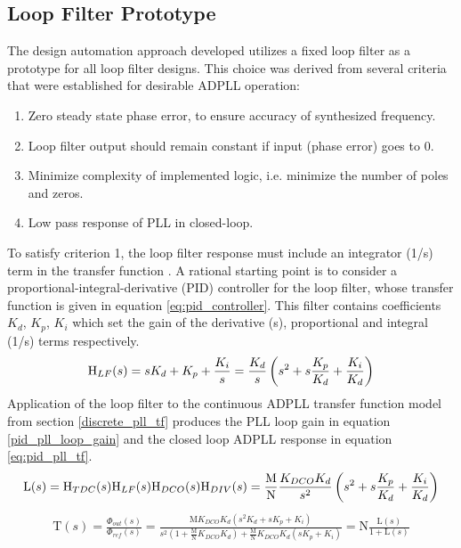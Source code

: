 \subsection{Loop Filter Prototype}
	The design automation approach developed utilizes a fixed loop filter as a prototype for all loop filter designs. This choice was derived from several criteria that were established for desirable ADPLL operation:
	\begin{enumerate}[itemsep=0pt,label=\protect\mycirc{\arabic*}]
		\setlength\itemsep{-0.8em}
		\item Zero steady state phase error, to ensure accuracy of synthesized frequency.
		\item Loop filter output should remain constant if input (phase error) goes to 0.
		\item Minimize complexity of implemented logic, i.e. minimize the number of poles and zeros.
		\item Low pass response of PLL in closed-loop.
	\end{enumerate}
	To satisfy criterion 1, the loop filter response must include an integrator (1/s) term in the transfer function \cite{ogata_2010}. A rational starting point is to consider a proportional-integral-derivative (PID) controller \cite{ogata_2010_pid} for the loop filter, whose transfer function is given in equation \ref{eq:pid_controller}. This filter contains coefficients $K_d$, $K_p$, $K_i$ which set the gain of the derivative (s), proportional and integral (1/s) terms respectively. 
	\begin{equation}\label{eq:pid_controller}
		\textnormal{H}_{LF}(s) = sK_d + K_p + \frac{K_i}{s} = \frac{K_d}{s}\left(s^2 + s\frac{K_p}{K_d} + \frac{K_i}{K_d}\right)
	\end{equation}
	Application of the loop filter to the continuous ADPLL transfer function model from section \ref{discrete_pll_tf} produces the PLL loop gain in equation \ref{pid_pll_loop_gain} and the closed loop ADPLL response in equation \ref{eq:pid_pll_tf}.
	\begin{equation} \label{pid_pll_loop_gain}
		\mathrm{L}(s) = \textnormal{H}_{TDC}(s)\textnormal{H}_{LF}(s)\textnormal{H}_{DCO}(s)\textnormal{H}_{DIV}(s) = \frac{\mathrm{M}}{\mathrm{N}}\frac{K_{DCO}K_d}{s^2}\left(s^2 + s\frac{K_p}{K_d} + \frac{K_i}{K_d}\right)
	\end{equation}
	\begin{align} \label{eq:pid_pll_tf}
		\mathrm{T}(s) = \frac{\Phi_{out}(s)}{\Phi_{ref}(s)} = \frac{\mathrm{M}K_{DCO}K_{d}\left(s^2K_d + sK_p + K_i\right)}{s^2\left(1 + \frac{\mathrm{M}}{\mathrm{N}}K_{DCO}K_d\right) + \frac{\mathrm{M}}{\mathrm{N}}K_{DCO}K_d\left(sK_p + K_i\right)} = \mathrm{N}\frac{\mathrm{L}(s)}{1 + \mathrm{L}(s)}
	\end{align}
